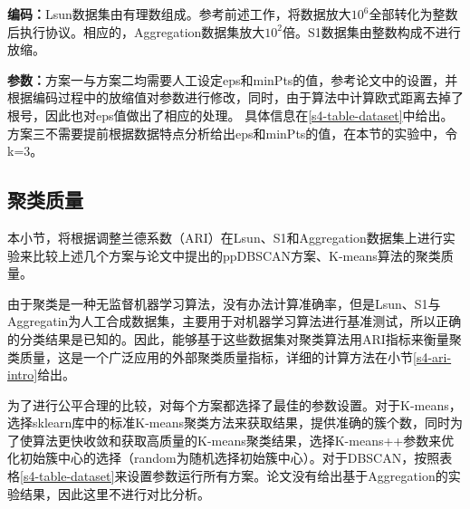 \textbf{编码：}Lsun数据集由有理数组成。参考前述工作\cite{jaschke2019unsupervised}，将数据放大$ 10^6 $全部转化为整数后执行协议。相应的，Aggregation数据集放大$ 10^2 $倍。S1数据集由整数构成不进行放缩。

\textbf{参数：}方案一与方案二均需要人工设定eps和minPts的值，参考论文\cite{bozdemir2021privacy}中的设置，并根据编码过程中的放缩值对参数进行修改，同时，由于算法中计算欧式距离去掉了根号，因此也对eps值做出了相应的处理。
具体信息在\ref{s4-table-dataset}中给出。
方案三不需要提前根据数据特点分析给出eps和minPts的值，在本节的实验中，令k=3。

\begin{table}[htbp]
	\centering
	\renewcommand{\arraystretch}{1.3}
	\caption{数据集具体信息}
	\label{s4-table-dataset}
\end{table}

\subsection{聚类质量}
本小节，将根据调整兰德系数（ARI）在Lsun、S1和Aggregation数据集上进行实验来比较上述几个方案与论文\cite{bozdemir2021privacy}中提出的ppDBSCAN方案、K-means算法的聚类质量。

由于聚类是一种无监督机器学习算法，没有办法计算准确率，但是Lsun、S1与Aggregatin为人工合成数据集，主要用于对机器学习算法进行基准测试，所以正确的分类结果是已知的。因此，能够基于这些数据集对聚类算法用ARI指标来衡量聚类质量，这是一个广泛应用的外部聚类质量指标\cite{vinh2009information,arbelaitz2013extensive}，详细的计算方法在小节\ref{s4-ari-intro}给出。

为了进行公平合理的比较，对每个方案都选择了最佳的参数设置。对于K-means，选择sklearn库中的标准K-means聚类方法\cite{buitinck2013api}来获取结果，提供准确的簇个数，同时为了使算法更快收敛和获取高质量的K-means聚类结果，选择K-means++参数来优化初始簇中心的选择（random为随机选择初始簇中心）。对于DBSCAN，按照表格\ref{s4-table-dataset}来设置参数运行所有方案。论文\cite{bozdemir2021privacy}没有给出基于Aggregation的实验结果，因此这里不进行对比分析。

